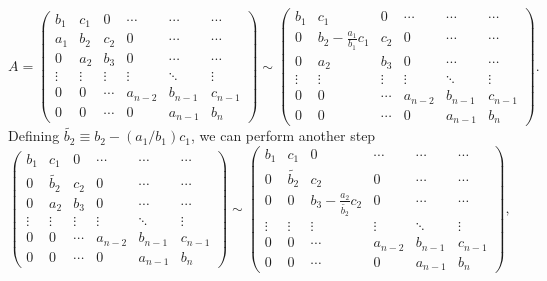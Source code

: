 \documentclass[english,notitlepage]{revtex4-1}  %
\begin{document}
\begin{equation}
	A =
	\begin{pmatrix}
	b_1 & c_1 & 0 & \cdots & \cdots & \cdots \\
	a_1 & b_2 & c_2 & 0  &\cdots & \cdots  \\ 
	0 & a_2 & b_3 & 0 & \cdots & \cdots \\
	\vdots & \vdots & \vdots & \vdots & \ddots & \vdots \\
	0 & 0 & \cdots & a_{n-2} & b_{n-1} & c_{n-1} \\
	0 & 0 & \cdots  & 0 & a_{n-1} & b_n
	\end{pmatrix}
	\sim 
	\begin{pmatrix}
	b_1 & c_1 & 0 & \cdots & \cdots & \cdots \\
	0 & b_2 - \frac{a_1}{b_1}c_1 & c_2 & 0  &\cdots & \cdots  \\ 
	0 & a_2 & b_3 & 0 & \cdots & \cdots \\
	\vdots & \vdots & \vdots & \vdots & \ddots & \vdots \\
	0 & 0 & \cdots & a_{n-2} & b_{n-1} & c_{n-1} \\
	0 & 0 & \cdots  & 0 & a_{n-1} & b_n
	\end{pmatrix}.
\end{equation}
Defining $\tilde{b_2} \equiv b_2 - (a_1/b_1)c_1$, we can perform another step
\begin{equation}
	\begin{pmatrix}
	b_1 & c_1 & 0 & \cdots & \cdots & \cdots \\
	0 & \tilde{b_2} & c_2 & 0  &\cdots & \cdots  \\ 
	0 & a_2 & b_3 & 0 & \cdots & \cdots \\
	\vdots & \vdots & \vdots & \vdots & \ddots & \vdots \\
	0 & 0 & \cdots & a_{n-2} & b_{n-1} & c_{n-1} \\
	0 & 0 & \cdots  & 0 & a_{n-1} & b_n
	\end{pmatrix}
	\sim
	\begin{pmatrix}
	b_1 & c_1 & 0 & \cdots & \cdots & \cdots \\
	0 & \tilde{b_2} & c_2 & 0  &\cdots & \cdots  \\ 
	0 & 0 & b_3 - \frac{a_2}{\tilde{b_2}}c_2 & 0 & \cdots & \cdots \\
	\vdots & \vdots & \vdots & \vdots & \ddots & \vdots \\
	0 & 0 & \cdots & a_{n-2} & b_{n-1} & c_{n-1} \\
	0 & 0 & \cdots  & 0 & a_{n-1} & b_n
	\end{pmatrix},
\end{equation}
\end{document}
